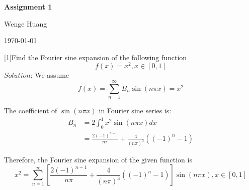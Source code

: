 \documentclass{article} %
\newcommand{\question}[2][]{\begin{flushleft}
        \textbf{Question #1}: {#2}

\end{flushleft}}
\newcommand{\maketitletwo}[2][]{\begin{center}
        \Large{\textbf{Assignment #1}       
        \vspace{5pt}
            } %
        \vspace{5pt}
        
        \normalsize{Wenge Huang  %
        
        \today}        %
        \vspace{15pt}
        
\end{center}}
\begin{document}
    \maketitletwo[1]  %
    
    \question[1]{Find the Fourier sine expansion of the following function
    \begin{equation}
    f(x) = x^{2},  x\in [0, 1]
    \end{equation}
    } 
    $Solution$: We assume $$f(x) = \sum_{n=1}^{\infty} B_{n} \sin (n\pi x) = x^{2}$$\par
    The coefficient of $\sin(n\pi x)$ in Fourier sine series is:
    \begin{align*}
B_{n} &= 2\int_{0}^{1} x^{2} \sin(n \pi x)dx \\
                 &= \frac{2(-1)^{n-1}}{n\pi}+\frac{4}{(n\pi)^{3}}((-1)^{n}-1)
    \end{align*}\par
    Therefore, the Fourier sine expansion of the given function is
    $$
    x^{2} = \sum_{n=1}^{\infty}\left[ \frac{2(-1)^{n-1}}{n\pi}+\frac{4}{(n\pi)^{3}}((-1)^{n}-1)\right]\sin(n\pi x), x\in [0,1]
    $$
    
    
    
\end{document}
